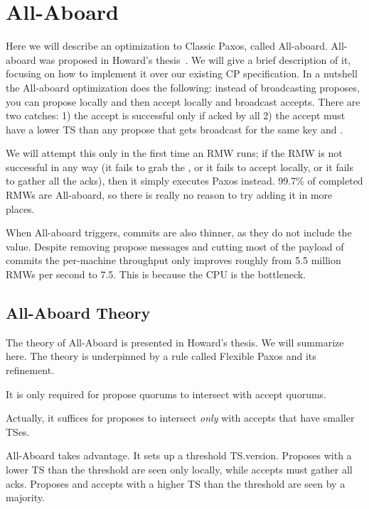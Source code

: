 \section{All-Aboard} \label{sec:all-aboard}

Here we will describe an optimization to Classic Paxos, called All-aboard. All-aboard was proposed in Howard's thesis~\cite{Howard:2019}. We will give a brief description of it, focusing on how to implement it over our existing CP specification.
In a nutshell the  All-aboard optimization does the following:
instead of broadcasting proposes, you can propose locally and then accept locally and broadcast accepts. There are two catches: 1) the accept is successful only if acked by all 2) the accept must have a lower TS than any propose that gets broadcast for the same key and \logno.

We will attempt this only in the first time an RMW runs; if the RMW is not successful in any way (\ie it fails to grab the \kv, or it fails to accept locally, or it fails to gather all the acks), then it simply executes Paxos instead. 99.7\% of completed RMWs are All-aboard, so there is really no reason to try adding it in more places.

When All-aboard triggers, commits are also thinner, as they do not include the value.
Despite removing propose messages and cutting most of the payload of commits the per-machine throughput only improves roughly from 5.5 million RMWs per second to 7.5. This is because the CPU is the bottleneck.

\subsection{All-Aboard Theory}
The theory of All-Aboard is presented in Howard's thesis. We will summarize here.
The theory is underpinned by a rule called Flexible Paxos and its refinement.

\custvspace{}
It is only required for propose quorums to intersect with accept quorums.

\custvspace{} 
Actually, it suffices for proposes to intersect \emph{only} with accepts that have smaller TSes.

\custvspace
All-Aboard takes advantage. It sets up a threshold TS.version. Proposes with a lower TS than the threshold are seen only locally, while accepts must gather all acks. Proposes and accepts with a higher TS than the threshold are seen by a majority.

